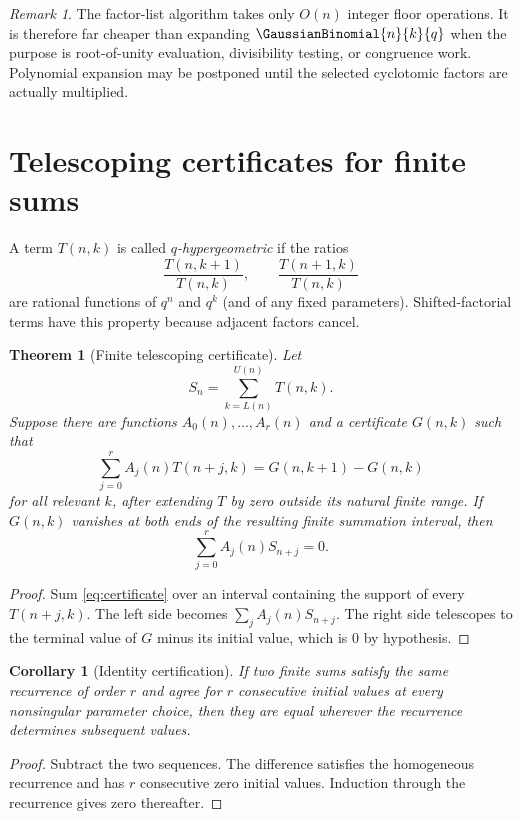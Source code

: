 \documentclass[11pt,a4paper,oneside,openany]{book}
\newtheorem{theorem}{Theorem}[chapter]
\newtheorem{corollary}[corollary]{Corollary}
\theoremstyle{definition}
\theoremstyle{remark}
\newtheorem{remark}[remark]{Remark}
\begin{document}
\begin{remark}
The factor-list algorithm takes only $O(n)$ integer floor operations.  It is therefore far cheaper than expanding $\GaussianBinomial{n}{k}{q}$ when the purpose is root-of-unity evaluation, divisibility testing, or congruence work.  Polynomial expansion may be postponed until the selected cyclotomic factors are actually multiplied.
\end{remark}

\section{Telescoping certificates for finite sums}

A term $T(n,k)$ is called \emph{$q$-hypergeometric} if the ratios
\[
 \frac{T(n,k+1)}{T(n,k)},
 \qquad
 \frac{T(n+1,k)}{T(n,k)}
\]
are rational functions of $q^n$ and $q^k$ (and of any fixed parameters).  Shifted-factorial terms have this property because adjacent factors cancel.

\begin{theorem}[Finite telescoping certificate]\label{thm:telescoping-certificate}
Let
\[
 S_n=\sum_{k=L(n)}^{U(n)}T(n,k).
\]
Suppose there are functions $A_0(n),\ldots,A_r(n)$ and a certificate $G(n,k)$ such that
\[
 \sum_{j=0}^{r}A_j(n)T(n+j,k)
 =G(n,k+1)-G(n,k)
 \tag{20.1}\label{eq:certificate}
\]
for all relevant $k$, after extending $T$ by zero outside its natural finite range.  If $G(n,k)$ vanishes at both ends of the resulting finite summation interval, then
\[
 \sum_{j=0}^{r}A_j(n)S_{n+j}=0.
 \tag{20.2}\label{eq:certified-recurrence}
\]
\end{theorem}

\begin{proof}
Sum \eqref{eq:certificate} over an interval containing the support of every $T(n+j,k)$.  The left side becomes
$\sum_jA_j(n)S_{n+j}$.  The right side telescopes to the terminal value of $G$ minus its initial value, which is $0$ by hypothesis.
\end{proof}

\begin{corollary}[Identity certification]\label{cor:identity-certification}
If two finite sums satisfy the same recurrence of order $r$ and agree for $r$ consecutive initial values at every nonsingular parameter choice, then they are equal wherever the recurrence determines subsequent values.
\end{corollary}

\begin{proof}
Subtract the two sequences.  The difference satisfies the homogeneous recurrence and has $r$ consecutive zero initial values.  Induction through the recurrence gives zero thereafter.
\end{proof}
\end{document}
